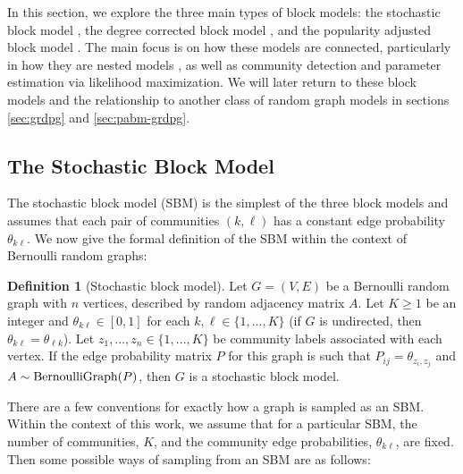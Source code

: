 \documentclass[
  11pt,
]{article}
\theoremstyle{definition}
\newtheorem{definition}{Definition}[section]
\theoremstyle{definition}
\theoremstyle{definition}
\theoremstyle{definition}
\theoremstyle{remark}
\begin{document}
In this section, we explore the three main types of block models:
the stochastic block model \citep{doi:10.1080/0022250X.1971.9989788}, the degree corrected block model \citep{Karrer_2011}, and the popularity adjusted block model \citep{307cbeb9b1be48299388437423d94bf1}.
The main focus is on how these models are connected, particularly in how they are nested models \citep{Noroozi2022}, as well as community detection and parameter estimation via likelihood maximization.
We will later return to these block models and the relationship to another class of random graph models in sections \ref{sec:grdpg} and \ref{sec:pabm-grdpg}.

\hypertarget{sec:sbm}{%
\subsection{The Stochastic Block Model}\label{sec:sbm}}

The stochastic block model (SBM) \citep{doi:10.1080/0022250X.1971.9989788} is the simplest of the three block models and assumes that each pair of communities \((k, \ell)\) has a constant edge probability \(\theta_{k \ell}\).
We now give the formal definition of the SBM within the context of Bernoulli random graphs:

\begin{definition}[Stochastic block model]
\label{def:sbm}
Let $G = (V, E)$ be a Bernoulli random graph with $n$ vertices, described by random adjacency matrix $A$. 
Let $K \geq 1$ be an integer and $\theta_{k \ell} \in [0, 1]$ for each $k, \ell \in \{1, ..., K\}$ (if $G$ is undirected, then $\theta_{k \ell} = \theta_{\ell k}$). 
Let $z_1, ..., z_n \in \{1, ..., K\}$ be community labels associated with each vertex. 
If the edge probability matrix $P$ for this graph is such that 
$P_{ij} = \theta_{z_i, z_j}$ and $A \sim \mathrm{BernoulliGraph}(P)$, then $G$ is a stochastic block model. 
\end{definition}

There are a few conventions for exactly how a graph is sampled as an SBM.
Within the context of this work, we assume that for a particular SBM, the number of communities, \(K\), and the community edge probabilities, \(\theta_{k \ell}\), are fixed.
Then some possible ways of sampling from an SBM are as follows:
\end{document}
